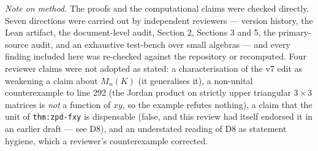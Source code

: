 \documentclass[11pt,a4paper]{article}
\newcommand{\cpt}[1]{\texttt{#1}}          %
\begin{document}
\medskip
\noindent\emph{Note on method.} The proofs and the computational claims were checked directly. Seven
directions were carried out by independent reviewers --- version history, the Lean artifact, the
document-level audit, Section 2, Sections 3 and 5, the primary-source audit, and an exhaustive
test-bench over small algebras --- and every finding included here was re-checked against the
repository or recomputed. Four reviewer claims were not adopted as stated: a characterisation of the v7 edit as
weakening a claim about $M_n(K)$ (it generalises it), a non-unital counterexample to line 292
(the Jordan product on strictly upper triangular $3\times3$ matrices is \emph{not} a function
of $xy$, so the example refutes nothing), a claim that the unit of \cpt{thm:zpd-fxy} is
dispensable (false, and this review had itself endorsed it in an earlier draft --- see D8),
and an understated reading of D8 as statement hygiene, which a reviewer's counterexample
corrected.
\end{document}
